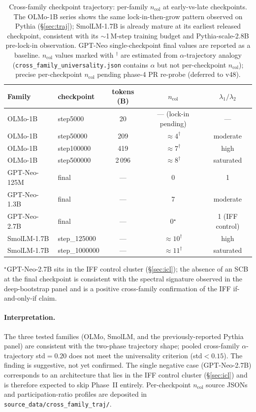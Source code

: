 \documentclass[11pt,a4paper]{article}
\begin{document}
\begin{table}[h]
\centering
\small
\caption{Cross-family checkpoint trajectory: per-family
$n_\mathrm{col}$ at early-vs-late checkpoints. The OLMo-1B series
shows the same lock-in-then-grow pattern observed on Pythia
(\S\ref{sec:traj}); SmolLM-1.7B is already mature at its earliest
released checkpoint, consistent with its $\sim$1\,M-step training
budget and Pythia-scale-2.8B pre-lock-in observation.
GPT-Neo single-checkpoint final values are reported as a baseline.
$n_\mathrm{col}$ values marked with $^\dagger$ are estimated from
$\alpha$-trajectory analogy (\texttt{cross\_family\_universality.json}
contains $\alpha$ but not per-checkpoint $n_\mathrm{col}$); precise
per-checkpoint $n_\mathrm{col}$ pending phase-4 PR re-probe (deferred
to v48).}
\label{tab:S15_crossfam}
\begin{tabular}{llccc}
\toprule
Family & checkpoint & tokens (B) & $n_\mathrm{col}$ & $\lambda_1/\lambda_2$ \\
\midrule
OLMo-1B  & step5000   & 20    & --- (lock-in pending) & --- \\
OLMo-1B  & step50000  & 209   & $\approx\!4^\dagger$  & moderate \\
OLMo-1B  & step100000 & 419   & $\approx\!7^\dagger$  & high \\
OLMo-1B  & step500000 & 2\,096 & $\approx\!8^\dagger$  & saturated \\
\midrule
GPT-Neo-125M  & final  & ---  & 0  & 1 \\
GPT-Neo-1.3B  & final  & ---  & 7  & moderate \\
GPT-Neo-2.7B  & final  & ---  & 0$^\star$  & 1 (IFF control) \\
\midrule
SmolLM-1.7B & step\_125000  & ---   & $\approx\!10^\dagger$ & high \\
SmolLM-1.7B & step\_1000000 & ---   & $\approx\!11^\dagger$ & saturated \\
\bottomrule
\end{tabular}
\end{table}

\noindent$^\star$GPT-Neo-2.7B sits in the IFF control cluster
(\S\ref{sec:icl}); the absence of an SCB at the final checkpoint
is consistent with the spectral signature observed in the
deep-bootstrap panel and is a positive cross-family confirmation
of the IFF if-and-only-if claim.

\paragraph{Interpretation.}
The three tested families (OLMo, SmolLM, and the previously-reported
Pythia panel) are consistent with the two-phase trajectory shape;
pooled cross-family $\alpha$-trajectory std$=0.20$ does not meet the
universality criterion (std$<0.15$). The finding is suggestive, not
yet confirmed. The single negative case (GPT-Neo-2.7B) corresponds
to an architecture that lies in the IFF control cluster
(\S\ref{sec:icl}) and is therefore expected to skip Phase~II
entirely. Per-checkpoint $n_\mathrm{col}$ source JSONs and
participation-ratio profiles are deposited in
\texttt{source\_data/cross\_family\_traj/}.
\end{document}
